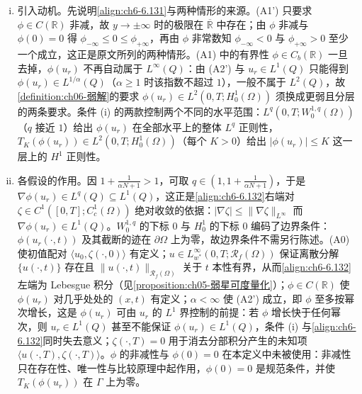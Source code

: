\documentclass[../../main.tex]{subfiles}%
\begin{document}
\begin{remark}\label{remark:ch06-无界弱解动机}
\begin{enumerate}[(i)]
\item 引入动机。先说明\eqref{align:ch6-6.131}与两种情形的来源。(A1') 只要求 $\phi\in C(\mathbb{R})$ 非减，故 $y\to\pm\infty$ 时的极限在 $\overline{\mathbb{R}}$ 中存在；由 $\phi$ 非减与 $\phi(0)=0$ 得 $\phi_{-\infty}\leqslant0\leqslant\phi_{+\infty}$，再由 $\phi$ 非常数知 $\phi_{-\infty}<0$ 与 $\phi_{+\infty}>0$ 至少一个成立，这正是原文所列的两种情形。(A1) 中的有界性 $\phi\in C_b(\mathbb{R})$ 一旦去掉，$\phi(u_r)$ 不再自动属于 $L^\infty(Q)$：由 (A2') 与 $u_r\in L^1(Q)$ 只能得到 $\phi(u_r)\in L^{1/\alpha}(Q)$（$\alpha\geqslant1$ 时该指数不超过 $1$），一般不属于 $L^2(Q)$，故\cref{definition:ch06-弱解}的要求 $\phi(u_r)\in L^2(0,T;H^1_0(\Omega))$ 须换成更弱且分层的两条要求。条件 (i) 的两款控制两个不同的水平范围：$L^q(0,T;W^{1,q}_0(\Omega))$（$q$ 接近 $1$）给出 $\phi(u_r)$ 在全部水平上的整体 $L^q$ 正则性，$T_K(\phi(u_r))\in L^2(0,T;H^1_0(\Omega))$（每个 $K>0$）给出 $|\phi(u_r)|\leqslant K$ 这一层上的 $H^1$ 正则性。

\item 各假设的作用。因 $1+\frac{1}{\alpha N+1}>1$，可取 $q\in(1,1+\frac{1}{\alpha N+1})$，于是 $\nabla\phi(u_r)\in L^q(Q)\subseteq L^1(Q)$，这正是\eqref{align:ch6-6.132}右端对 $\zeta\in C^1([0,T];C^1_c(\Omega))$ 绝对收敛的依据：$|\nabla\zeta|\leqslant\|\nabla\zeta\|_{L^\infty}$ 而 $\nabla\phi(u_r)\in L^1(Q)$。$W^{1,q}_0$ 的下标 $0$ 与 $H^1_0$ 的下标 $0$ 编码了边界条件：$\phi(u_r(\cdot,t))$ 及其截断的迹在 $\partial\Omega$ 上为零，故边界条件不需另行陈述。(A0) 使初值配对 $\langle u_0,\zeta(\cdot,0)\rangle$ 有定义；$u\in L^\infty_{w^*}(0,T;\mathscr{R}_f(\Omega))$ 保证离散分解 $\{u(\cdot,t)\}$ 存在且 $\|u(\cdot,t)\|_{\mathscr{R}_f(\Omega)}$ 关于 $t$ 本性有界，从而\eqref{align:ch6-6.132}左端为 Lebesgue 积分（见\cref{proposition:ch05-弱星可度量化}）；$\phi\in C(\mathbb{R})$ 使 $\phi(u_r)$ 对几乎处处的 $(x,t)$ 有定义；$\alpha<\infty$ 使 (A2') 成立，即 $\phi$ 至多按幂次增长，这是 $\phi(u_r)$ 可由 $u_r$ 的 $L^1$ 界控制的前提：若 $\phi$ 增长快于任何幂次，则 $u_r\in L^1(Q)$ 甚至不能保证 $\phi(u_r)\in L^1(Q)$，条件 (i) 与\eqref{align:ch6-6.132}同时失去意义；$\zeta(\cdot,T)=0$ 用于消去分部积分产生的未知项 $\langle u(\cdot,T),\zeta(\cdot,T)\rangle$。$\phi$ 的非减性与 $\phi(0)=0$ 在本定义中未被使用：非减性只在存在性、唯一性与比较原理中起作用，$\phi(0)=0$ 是规范条件，并使 $T_K(\phi(u_r))$ 在 $\Gamma$ 上为零。


\end{enumerate}
\end{remark}
\end{document}
